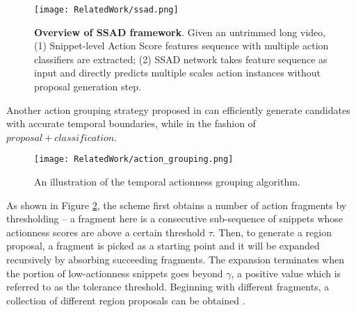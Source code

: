 \begin{figure}[h!]
  \centering
  \texttt{[image: RelatedWork/ssad.png]}
  \caption{\textbf{Overview of SSAD framework}. Given an untrimmed long video, (1) Snippet-level Action
           Score features sequence with multiple action classifiers are extracted; (2) SSAD network
           takes feature sequence as input and directly predicts multiple scales action instances
           without proposal generation step. \cite{lin2017}}
  \label{fig:ssad}
\end{figure} 
 
Another action grouping strategy proposed in \cite{DBLP:journals/corr/XiongZWLT17} can efficiently generate candidates with accurate temporal boundaries, while in the fashion of $proposal + classification$. 

\begin{figure}[H]
  \centering
  \texttt{[image: RelatedWork/action\_grouping.png]}
  \caption{An illustration of the temporal actionness grouping algorithm. 
           \cite{DBLP:journals/corr/XiongZWLT17}}
  \label{fig:action_grouping}
\end{figure} 

As shown in Figure \ref{fig:action_grouping}, the scheme first obtains a number of action fragments by thresholding – a fragment here is a consecutive sub-sequence of snippets whose actionness scores are above a certain threshold $\tau$. Then, to generate a region proposal, a fragment is picked as a starting point and it will be expanded recursively by absorbing succeeding fragments. The expansion terminates when the portion of low-actionness snippets goes beyond $\gamma$, a positive value which is referred to as the tolerance threshold. Beginning with different fragments, a collection of different region proposals can be obtained \cite{DBLP:journals/corr/XiongZWLT17}.
